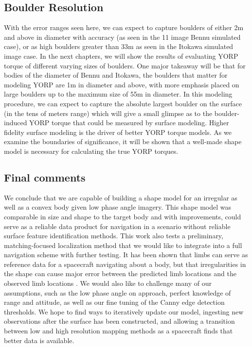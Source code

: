 \subsection{Boulder Resolution}
With the error ranges seen here, we can expect to capture boulders of either 2m and above in diameter with accuracy (as seen in the 11 image Bennu simulated case), or as high boulders greater than 33m as seen in the Itokawa simulated image case. In the next chapters, we will show the results of evaluating YORP torque of different varying sizes of boulders. One major takeaway will be that for bodies of the diameter of Bennu and Itokawa, the boulders that matter for modeling YORP are 1m in diameter and above, with more emphasis placed on large boulders up to the maximum size of 55m in diameter. In this modeling procedure, we can expect to capture the absolute largest boulder on the surface (in the tens of meters range) which will give a small glimpse as to the boulder-induced YORP torque that could be measured by surface modeling. Higher fidelity surface modeling is the driver of better YORP torque models. As we examine the boundaries of significance, it will be shown that a well-made shape model is necessary for calculating the true YORP torques.






\subsection{Final comments}
We conclude that we are capable of building a shape model for an irregular as well as a convex body given low phase angle imagery. This shape model was comparable in size and shape to the target body and with improvements, could serve as a reliable data product for navigation in a scenario without reliable surface feature identification methods. This work also tests a preliminary, matching-focused localization method that we would like to integrate into a full navigation scheme with further testing. It has been shown that limbs can serve as reference data for a spacecraft navigating about a body, but that irregularities in the shape can cause major error between the predicted limb locations and the observed limb locations \cite{Liounis}. We would also like to challenge many of our assumptions, such as the low phase angle on approach, perfect knowledge of range and attitude, as well as our fine tuning of the Canny edge detection thresholds. We hope to find ways to iteratively update our model, ingesting new observations after the surface has been constructed, and allowing a transition between low and high resolution mapping methods as a spacecraft finds that better data is available.

